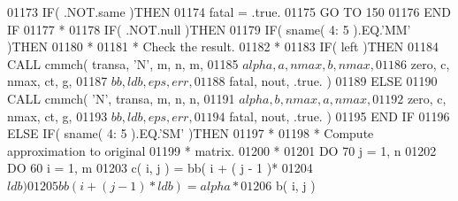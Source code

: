 \begin{DoxyCode}
01173                            \textcolor{keywordflow}{IF}( .NOT.same )\textcolor{keywordflow}{THEN}
01174                               fatal = .true.
01175                               \textcolor{keywordflow}{GO TO} 150
01176 \textcolor{keywordflow}{                           END IF}
01177 \textcolor{comment}{*}
01178                            \textcolor{keywordflow}{IF}( .NOT.null )\textcolor{keywordflow}{THEN}
01179                               \textcolor{keywordflow}{IF}( sname( 4: 5 ).EQ.\textcolor{stringliteral}{'MM'} )\textcolor{keywordflow}{THEN}
01180 \textcolor{comment}{*}
01181 \textcolor{comment}{*                                Check the result.}
01182 \textcolor{comment}{*}
01183                                  \textcolor{keywordflow}{IF}( left )\textcolor{keywordflow}{THEN}
01184                                     \textcolor{keyword}{CALL }cmmch( transa, \textcolor{stringliteral}{'N'}, m, n, m,
01185      $                                          alpha, a, nmax, b, nmax,
01186      $                                          zero, c, nmax, ct, g,
01187      $                                          bb, ldb, eps, err,
01188      $                                          fatal, nout, .true. )
01189                                  \textcolor{keywordflow}{ELSE}
01190                                     \textcolor{keyword}{CALL }cmmch( \textcolor{stringliteral}{'N'}, transa, m, n, n,
01191      $                                          alpha, b, nmax, a, nmax,
01192      $                                          zero, c, nmax, ct, g,
01193      $                                          bb, ldb, eps, err,
01194      $                                          fatal, nout, .true. )
01195 \textcolor{keywordflow}{                                 END IF}
01196                               \textcolor{keywordflow}{ELSE} \textcolor{keywordflow}{IF}( sname( 4: 5 ).EQ.\textcolor{stringliteral}{'SM'} )\textcolor{keywordflow}{THEN}
01197 \textcolor{comment}{*}
01198 \textcolor{comment}{*                                Compute approximation to original}
01199 \textcolor{comment}{*                                matrix.}
01200 \textcolor{comment}{*}
01201                                  \textcolor{keywordflow}{DO} 70 j = 1, n
01202                                     \textcolor{keywordflow}{DO} 60 i = 1, m
01203                                        c( i, j ) = bb( i + ( j - 1 )*
01204      $                                             ldb )
01205                                        bb( i + ( j - 1 )*ldb ) = alpha*
01206      $                                    b( i, j )

\end{DoxyCode}
